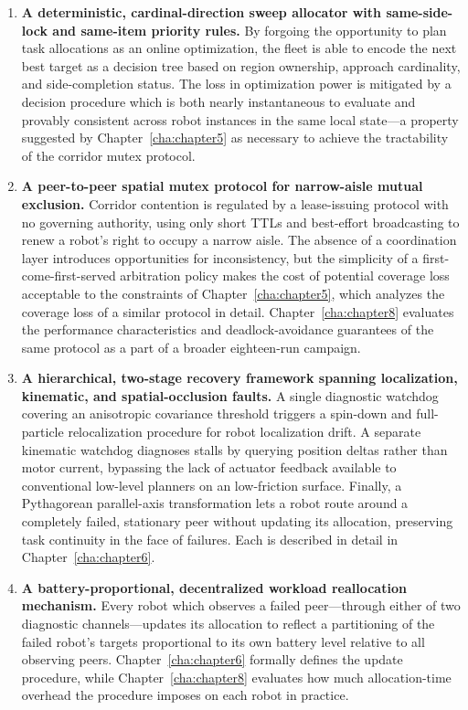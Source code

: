 \begin{enumerate}
    \item \textbf{A deterministic, cardinal-direction sweep allocator with same-side-lock and same-item priority rules.} By forgoing the opportunity to plan task allocations as an online optimization, the fleet is able to encode the next best target as a decision tree based on region ownership, approach cardinality, and side-completion status. The loss in optimization power is mitigated by a decision procedure which is both nearly instantaneous to evaluate and provably consistent across robot instances in the same local state---a property suggested by Chapter~\ref{cha:chapter5} as necessary to achieve the tractability of the corridor mutex protocol.

    \item \textbf{A peer-to-peer spatial mutex protocol for narrow-aisle mutual exclusion.} Corridor contention is regulated by a lease-issuing protocol with no governing authority, using only short TTLs and best-effort broadcasting to renew a robot's right to occupy a narrow aisle. The absence of a coordination layer introduces opportunities for inconsistency, but the simplicity of a first-come-first-served arbitration policy makes the cost of potential coverage loss acceptable to the constraints of Chapter~\ref{cha:chapter5}, which analyzes the coverage loss of a similar protocol in detail. Chapter~\ref{cha:chapter8} evaluates the performance characteristics and deadlock-avoidance guarantees of the same protocol as a part of a broader eighteen-run campaign.

    \item \textbf{A hierarchical, two-stage recovery framework spanning localization, kinematic, and spatial-occlusion faults.} A single diagnostic watchdog covering an anisotropic covariance threshold triggers a spin-down and full-particle relocalization procedure for robot localization drift. A separate kinematic watchdog diagnoses stalls by querying position deltas rather than motor current, bypassing the lack of actuator feedback available to conventional low-level planners on an low-friction surface. Finally, a Pythagorean parallel-axis transformation lets a robot route around a completely failed, stationary peer without updating its allocation, preserving task continuity in the face of failures. Each is described in detail in Chapter~\ref{cha:chapter6}.

    \item \textbf{A battery-proportional, decentralized workload reallocation mechanism.} Every robot which observes a failed peer---through either of two diagnostic channels---updates its allocation to reflect a partitioning of the failed robot's targets proportional to its own battery level relative to all observing peers. Chapter~\ref{cha:chapter6} formally defines the update procedure, while Chapter~\ref{cha:chapter8} evaluates how much allocation-time overhead the procedure imposes on each robot in practice.


\end{enumerate}
